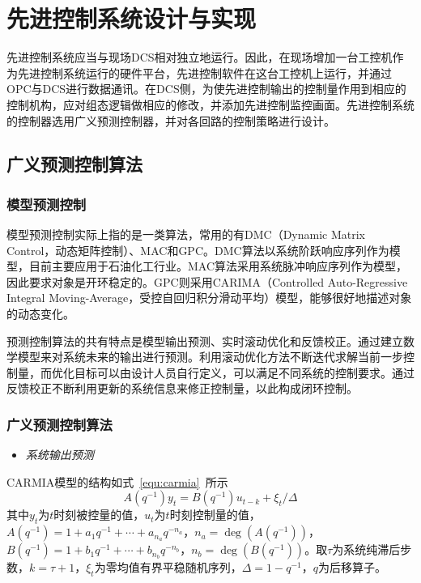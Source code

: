 \chapter{先进控制系统设计与实现}
\label{chap:design}
先进控制系统应当与现场DCS相对独立地运行。因此，在现场增加一台工控机作为先进控制系统运行的硬件平台，先进控制软件在这台工控机上运行，并通过OPC与DCS进行数据通讯。在DCS侧，为使先进控制输出的控制量作用到相应的控制机构，应对组态逻辑做相应的修改，并添加先进控制监控画面。先进控制系统的控制器选用广义预测控制器，并对各回路的控制策略进行设计。



\section{广义预测控制算法}
\subsection{模型预测控制}
模型预测控制实际上指的是一类算法，常用的有DMC（Dynamic Matrix Control，动态矩阵控制）、MAC和GPC。DMC算法以系统阶跃响应序列作为模型，目前主要应用于石油化工行业\cite{cutler1980dynamic}。MAC算法采用系统脉冲响应序列作为模型，因此要求对象是开环稳定的\cite{richalet1978model}。GPC则采用CARIMA（Controlled Auto-Regressive Integral Moving-Average，受控自回归积分滑动平均）模型，能够很好地描述对象的动态变化\cite{clarke1987generalized}。

预测控制算法的共有特点是模型输出预测、实时滚动优化和反馈校正。通过建立数学模型来对系统未来的输出进行预测。利用滚动优化方法不断迭代求解当前一步控制量，而优化目标可以由设计人员自行定义，可以满足不同系统的控制要求。通过反馈校正不断利用更新的系统信息来修正控制量，以此构成闭环控制。
\subsection{广义预测控制算法}

\begin{itemize}
\item{\emph{系统输出预测}}
\end{itemize}

CARMIA模型的结构如式~\ref{equ:carmia}~所示
\begin{equation}
\label{equ:carmia}
        A(q^{-1}) y_{t}=B(q^{-1}) u_{t-k}+{\xi_{t}}/{\Delta}
\end{equation}
其中$y_{t}$为$t$时刻被控量的值，$u_{t}$为$t$时刻控制量的值，$A(q^{-1})=1+a_1q^{-1}+\cdots+a_{n_a}q^{-n_a}$，$n_a = \deg (A(q^{-1}))$，$B(q^{-1})=1+b_1q^{-1}+\cdots+b_{n_b}q^{-n_b}$，$n_b = \deg (B(q^{-1}))$。取$\tau$为系统纯滞后步数，$k=\tau+1$，${\xi_t}$为零均值有界平稳随机序列，$\Delta = 1- q^{-1}$，$q$为后移算子。

